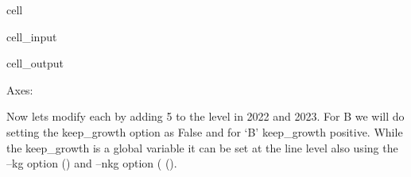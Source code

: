 \documentclass[letterpaper,10pt,english]{jupyterBook}
\begin{document}
\begin{sphinxuseclass}{cell}\begin{sphinxVerbatimInput}

\begin{sphinxuseclass}{cell_input}
\begin{sphinxVerbatim}[commandchars=\\\{\}]
\PYG{p}{[}\PYG{p}{[}\PYG{p}{]}\PYG{p}{]}
\end{sphinxVerbatim}

\end{sphinxuseclass}\end{sphinxVerbatimInput}
\begin{sphinxVerbatimOutput}

\begin{sphinxuseclass}{cell_output}
\begin{sphinxVerbatim}[commandchars=\\\{\}]
\PYGZlt{}Axes: \PYGZgt{}
\end{sphinxVerbatim}

\noindent{}

\end{sphinxuseclass}\end{sphinxVerbatimOutput}

\end{sphinxuseclass}
\sphinxAtStartPar
Now lets modify each by adding 5 to the level in 2022 and 2023.  For B we will do setting the keep\_growth option as False and for ‘B’ keep\_growth positive.  While the keep\_growth is a global variable it can be set at the line level also using the –kg option () and –nkg option ( ().
\end{document}

